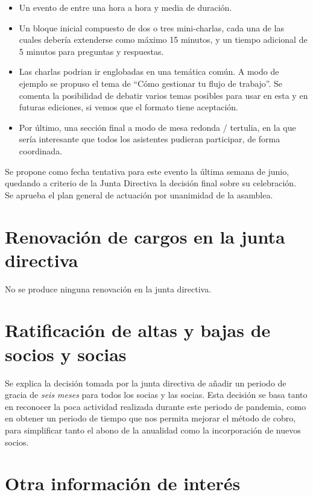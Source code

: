 \documentclass[a4paper,12pt]{article}
\begin{document}
\begin{itemize}
    \item Un evento de entre una hora a hora y media de duración.
    \item Un bloque inicial compuesto de dos o tres mini-charlas, cada una de las cuales debería extenderse como máximo 15 minutos, y un tiempo adicional de 5 minutos para preguntas y respuestas.
    \item Las charlas podrian ir englobadas en una temática común. A modo de ejemplo se propuso el tema de ``Cómo gestionar tu flujo de trabajo''. Se comenta la posibilidad de debatir varios temas posibles para usar en esta y en futuras ediciones, si vemos que el formato tiene aceptación.
    \item Por último, una sección final a modo de mesa redonda / tertulia, en la que sería interesante que todos los asistentes pudieran participar, de forma coordinada.
\end{itemize}

Se propone como fecha tentativa para este evento la última semana de junio, quedando a criterio de la Junta Directiva la decisión final sobre su celebración.\\

Se aprueba el plan general de actuación por unanimidad de la asamblea.

\section{Renovación de cargos en la junta directiva}

No se produce ninguna renovación en la junta directiva.

\section{Ratificación de altas y bajas de socios y socias}

Se explica la decisión tomada por la junta directiva de añadir un periodo de gracia de \emph{seis meses} para todos los socias y las socias. Esta decisión se basa tanto en reconocer la poca actividad realizada durante este periodo de pandemia, como en obtener un periodo de tiempo que nos permita mejorar el método de cobro, para simplificar tanto el abono de la anualidad como la incorporación de nuevos socios.

\section{Otra información de interés}
\end{document}
